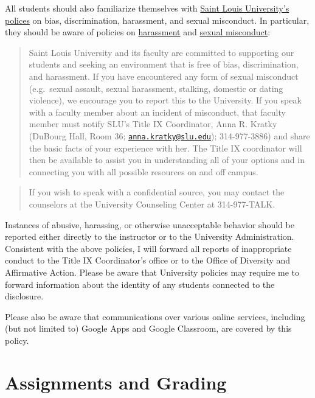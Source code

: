 \documentclass[]{book}
\theoremstyle{definition}
\theoremstyle{definition}
\theoremstyle{definition}
\theoremstyle{remark}
\begin{document}
All students should also familiarize themselves with
\href{http://www.slu.edu/general-counsel-home/office-of-institutional-equity-and-diversity}{Saint
Louis University's polices} on bias, discrimination, harassment, and
sexual misconduct. In particular, they should be aware of policies on
\href{https://www.slu.edu/general-counsel/institutional-equity-diversity/pdfs/harassment-policy.pdf}{harassment}
and
\href{https://www.slu.edu/about/safety/sexual-assault-resources.php}{sexual
misconduct}:

\begin{quote}
Saint Louis University and its faculty are committed to supporting our
students and seeking an environment that is free of bias,
discrimination, and harassment. If you have encountered any form of
sexual misconduct (e.g.~sexual assault, sexual harassment, stalking,
domestic or dating violence), we encourage you to report this to the
University. If you speak with a faculty member about an incident of
misconduct, that faculty member must notify SLU's Title IX Coordinator,
Anna R. Kratky (DuBourg Hall, Room 36;
\href{mailto:anna.kratky@slu.edu}{\nolinkurl{anna.kratky@slu.edu}});
314-977-3886) and share the basic facts of your experience with her. The
Title IX coordinator will then be available to assist you in
understanding all of your options and in connecting you with all
possible resources on and off campus.
\end{quote}

\begin{quote}
If you wish to speak with a confidential source, you may contact the
counselors at the University Counseling Center at 314-977-TALK.
\end{quote}

Instances of abusive, harassing, or otherwise unacceptable behavior
should be reported either directly to the instructor or to the
University Administration. Consistent with the above policies, I will
forward all reports of inappropriate conduct to the Title IX
Coordinator's office or to the Office of Diversity and Affirmative
Action. Please be aware that University policies may require me to
forward information about the identity of any students connected to the
disclosure.

Please also be aware that communications over various online services,
including (but not limited to) Google Apps and Google Classroom, are
covered by this policy.

\hypertarget{assignments-and-grading}{%
\chapter{Assignments and Grading}\label{assignments-and-grading}}
\end{document}

